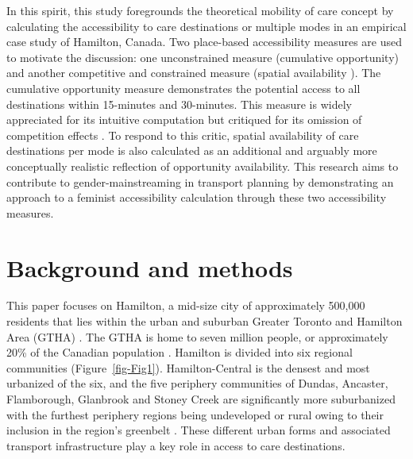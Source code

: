 \documentclass[
  authoryear,
  preprint,
  3p]{elsarticle}
\begin{document}
In this spirit, this study foregrounds the theoretical mobility of care
concept by calculating the accessibility to care destinations or
multiple modes in an empirical case study of Hamilton, Canada. Two
place-based accessibility measures are used to motivate the discussion:
one unconstrained measure (cumulative opportunity) and another
competitive and constrained measure (spatial availability
\citep{soukhovIntroducingSpatialAvailability2023}). The cumulative
opportunity measure demonstrates the potential access to all
destinations within 15-minutes and 30-minutes. This measure is widely
appreciated for its intuitive computation
\citep{handyAccessibilityIdeaWhose2020, handyMeasuringAccessibilityExploration1997, kelobonyeRelativeAccessibilityAnalysis2019, chengInvestigatingWalkingAccessibility2019}
but critiqued for its omission of competition effects
\citep{paezDemand2019, soukhovIntroducingSpatialAvailability2023, kelobonyeMeasuringAccessibilitySpatial2020, merlinDoesCompetitionMatter2017}.
To respond to this critic, spatial availability of care destinations per
mode is also calculated as an additional and arguably more conceptually
realistic reflection of opportunity availability. This research aims to
contribute to gender-mainstreaming in transport planning by
demonstrating an approach to a feminist accessibility calculation
through these two accessibility measures.

\hypertarget{background-and-methods}{%
\section{Background and methods}\label{background-and-methods}}

This paper focuses on Hamilton, a mid-size city of approximately 500,000
residents that lies within the urban and suburban Greater Toronto and
Hamilton Area (GTHA) \citep{transportationtomorrowsurvey2018}. The GTHA
is home to seven million people, or approximately 20\% of the Canadian
population \citep{cityoftoronto2021CensusPopulationa2022}. Hamilton is
divided into six regional communities (Figure~\ref{fig-Fig1}).
Hamilton-Central is the densest and most urbanized of the six, and the
five periphery communities of Dundas, Ancaster, Flamborough, Glanbrook
and Stoney Creek are significantly more suburbanized with the furthest
periphery regions being undeveloped or rural owing to their inclusion in
the region's greenbelt
\citep{greenbeltfoundationThrivingGreenbeltThriving2023}. These
different urban forms and associated transport infrastructure play a key
role in access to care destinations.
\end{document}
